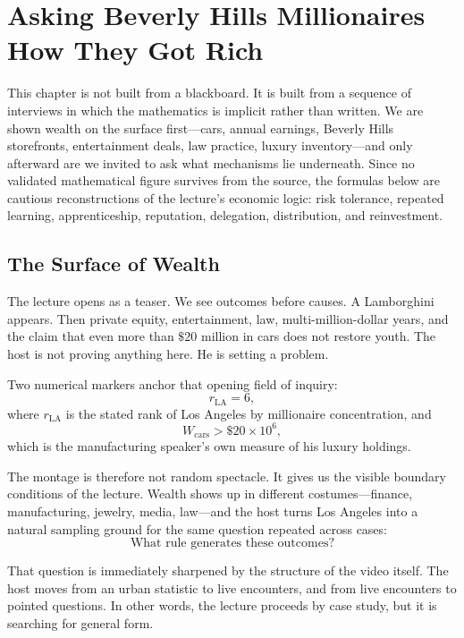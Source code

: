 \chapter{Asking Beverly Hills Millionaires How They Got Rich}

This chapter is not built from a blackboard. It is built from a sequence of interviews in which the mathematics is implicit rather than written. We are shown wealth on the surface first---cars, annual earnings, Beverly Hills storefronts, entertainment deals, law practice, luxury inventory---and only afterward are we invited to ask what mechanisms lie underneath. Since no validated mathematical figure survives from the source, the formulas below are cautious reconstructions of the lecture's economic logic: risk tolerance, repeated learning, apprenticeship, reputation, delegation, distribution, and reinvestment.

\section{The Surface of Wealth}

The lecture opens as a teaser. We see outcomes before causes. A Lamborghini appears. Then private equity, entertainment, law, multi-million-dollar years, and the claim that even more than \(\$20\) million in cars does not restore youth. The host is not proving anything here. He is setting a problem.

Two numerical markers anchor that opening field of inquiry:
\begin{equation}
r_{\mathrm{LA}} = 6,
\end{equation}
where \(r_{\mathrm{LA}}\) is the stated rank of Los Angeles by millionaire concentration, and
\begin{equation}
W_{\mathrm{cars}} > \$20\times 10^6,
\end{equation}
which is the manufacturing speaker's own measure of his luxury holdings.

The montage is therefore not random spectacle. It gives us the visible boundary conditions of the lecture. Wealth shows up in different costumes---finance, manufacturing, jewelry, media, law---and the host turns Los Angeles into a natural sampling ground for the same question repeated across cases:
\[
\mbox{What rule generates these outcomes?}
\]

That question is immediately sharpened by the structure of the video itself. The host moves from an urban statistic to live encounters, and from live encounters to pointed questions. In other words, the lecture proceeds by case study, but it is searching for general form.

